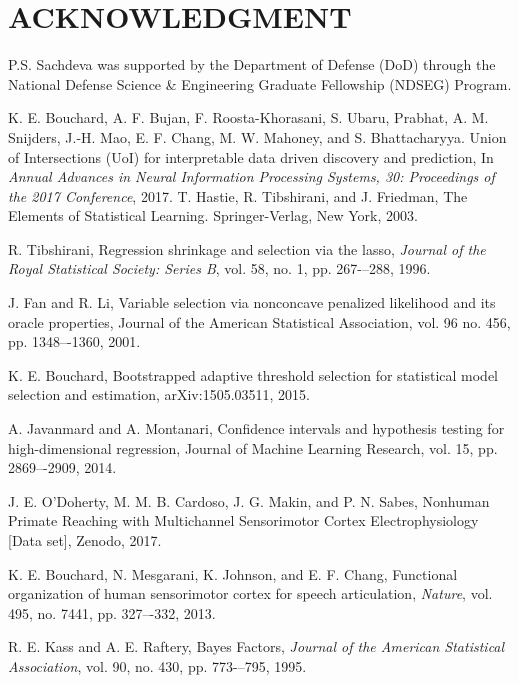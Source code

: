 \documentclass[letterpaper, 10 pt, conference]{ieeeconf}  %
\begin{document}
\section*{ACKNOWLEDGMENT}

P.S. Sachdeva was supported by the Department of Defense (DoD) through the National Defense Science \& Engineering Graduate Fellowship (NDSEG) Program.






\begin{thebibliography}{99}

 K. E. Bouchard, A. F. Bujan, F. Roosta-Khorasani, S. Ubaru, Prabhat, A. M. Snijders, J.-H. Mao, E. F. Chang, M. W. Mahoney, and S. Bhattacharyya. Union of Intersections (UoI) for interpretable data driven discovery and prediction, In \textit{Annual Advances in Neural Information Processing Systems, 30: Proceedings of the 2017 Conference}, 2017.
 T. Hastie, R. Tibshirani, and J. Friedman, The Elements of Statistical Learning. Springer-Verlag, New York, 2003.

 R. Tibshirani, Regression shrinkage and selection via the lasso, \textit{Journal of the Royal Statistical Society: Series B}, vol. 58, no. 1, pp. 267-–288, 1996.

 J. Fan and R. Li, Variable selection via nonconcave penalized likelihood and its oracle properties, Journal of the American Statistical Association, vol. 96 no. 456, pp. 1348–-1360, 2001.

 K. E. Bouchard, Bootstrapped adaptive threshold selection for statistical model selection and estimation, arXiv:1505.03511, 2015.

 A. Javanmard and A. Montanari, Confidence intervals and hypothesis testing for high-dimensional regression, Journal of Machine Learning Research, vol. 15, pp. 2869–-2909, 2014.

 J. E. O'Doherty, M. M. B. Cardoso, J. G. Makin, and P. N. Sabes, Nonhuman Primate Reaching with Multichannel Sensorimotor Cortex Electrophysiology [Data set], Zenodo, 2017.

 K. E. Bouchard, N. Mesgarani, K. Johnson, and E. F. Chang, Functional organization of human sensorimotor cortex for speech articulation, \textit{Nature}, vol. 495, no. 7441, pp. 327–-332, 2013.

 R. E. Kass and A. E. Raftery, Bayes Factors, \textit{Journal of the American Statistical Association}, vol. 90, no. 430, pp. 773-–795, 1995.






\end{thebibliography}
\end{document}
